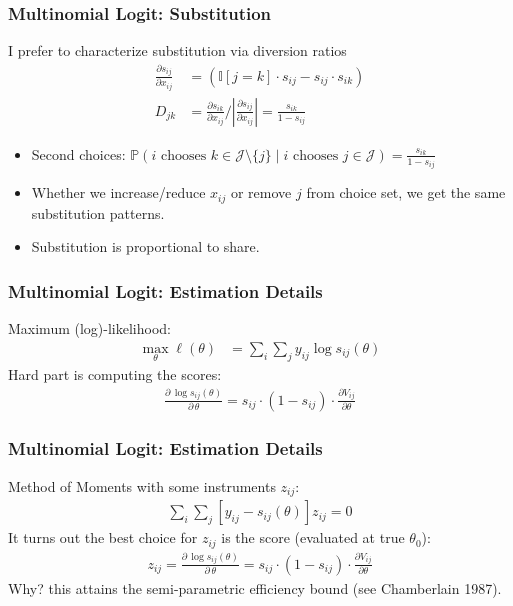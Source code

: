 \begin{frame}
\frametitle{Multinomial Logit: Substitution}
I prefer to characterize substitution via diversion ratios
\begin{align*}
\frac{\partial s_{ij}}{\partial x_{ij}} &=\left(\mathbb{I}[j = k]\cdot s_{ij} - s_{ij}\cdot s_{ik} \right)\\
D_{jk} &= \frac{\partial s_{ik}}{\partial x_{ij}} / \left|\frac{\partial s_{ij}}{\partial x_{ij}}\right| = \frac{s_{ik}}{1-s_{ij}}
\end{align*}
\begin{itemize}
\item Second choices: $\mathbb{P}\left(i \text { chooses } k \in \mathcal{J} \setminus \{j\} \mid i \text { chooses } j \in \mathcal{J} \right) =\frac{s_{ik}}{1-s_{ij}}$
\item Whether we increase/reduce $x_{ij}$ or remove $j$ from choice set, we get the same substitution patterns.
\item Substitution is \alert{proportional to share}.
\end{itemize}
\end{frame}


\begin{frame}
\frametitle{Multinomial Logit: Estimation Details}
Maximum (log)-likelihood:
\begin{align*}
\max_{\theta} \ell(\theta) &= \sum_{i} \sum_j y_{ij} \log   s_{ij}(\theta)
\end{align*}
Hard part is computing the \alert{scores}:
\begin{align*}
\frac{\partial \, \log   s_{ij}(\theta)}{\partial\, \theta} = s_{ij} \cdot (1-s_{ij}) \cdot \frac{\partial V_{ij}}{\partial \theta}
\end{align*}
\end{frame}



\begin{frame}
\frametitle{Multinomial Logit: Estimation Details}
Method of Moments with some \alert{instruments} $z_{ij}$:
\begin{align*}
 \sum_{i} \sum_j \left[y_{ij} -  s_{ij}(\theta) \right] z_{ij}=0
\end{align*}
It turns out the best choice for $z_{ij}$ is the \alert{score} (evaluated at true $\theta_0$):
\begin{align*}
z_{ij} = \frac{\partial \, \log   s_{ij}(\theta)}{\partial\, \theta} = s_{ij} \cdot (1-s_{ij}) \cdot \frac{\partial V_{ij}}{\partial \theta}
\end{align*}
Why? this attains the semi-parametric efficiency bound (see Chamberlain 1987).
\end{frame}


